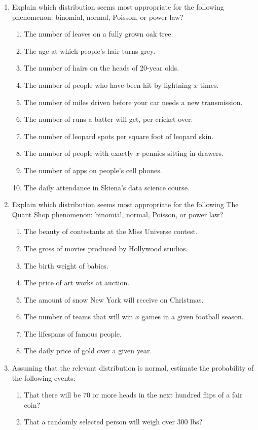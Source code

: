 \documentclass[10pt]{article}
\begin{document}
\begin{enumerate}
    \item Explain which distribution seems most appropriate for the following phenomenon: binomial, normal, Poisson, or power law?
    \begin{enumerate}
        \item The number of leaves on a fully grown oak tree.
        \item The age at which people's hair turns grey.
        \item The number of hairs on the heads of 20-year olds.
        \item The number of people who have been hit by lightning $x$ times.
        \item The number of miles driven before your car needs a new transmission.
        \item The number of runs a batter will get, per cricket over.
        \item The number of leopard spots per square foot of leopard skin.
        \item The number of people with exactly $x$ pennies sitting in drawers.
        \item The number of apps on people's cell phones.
        \item The daily attendance in Skiena's data science course.
    \end{enumerate}

    \item Explain which distribution seems most appropriate for the following The Quant Shop phenomenon: binomial, normal, Poisson, or power law?
    \begin{enumerate}
        \item The beauty of contestants at the Miss Universe contest.
        \item The gross of movies produced by Hollywood studios.
        \item The birth weight of babies.
        \item The price of art works at auction.
        \item The amount of snow New York will receive on Christmas.
        \item The number of teams that will win $x$ games in a given football season.
        \item The lifespans of famous people.
        \item The daily price of gold over a given year.
    \end{enumerate}
    \item Assuming that the relevant distribution is normal, estimate the probability of the following events:
    \begin{enumerate}
        \item That there will be 70 or more heads in the next hundred flips of a fair coin?
        \item That a randomly selected person will weigh over 300 lbs?
    \end{enumerate}


\end{enumerate}
\end{document}
